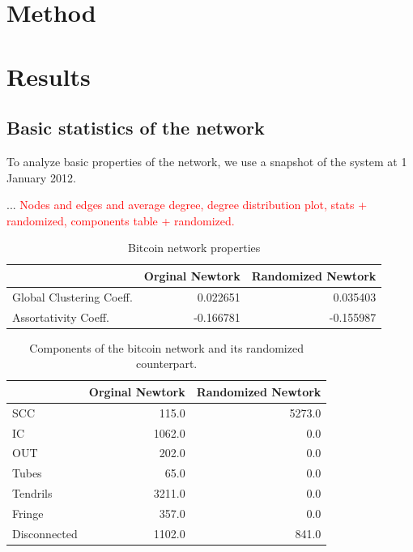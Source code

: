 \documentclass{Resources/netsci-project}
\begin{document}
\section{Method}

\lipsum

\section{Results}

\subsection{Basic statistics of the network}

To analyze basic properties of the network, we use a snapshot of the system at 1 January 2012. \newline

... \textcolor{red}{Nodes and edges and average degree, degree distribution plot, stats + randomized, components table + randomized.}

\lipsum[2]

\begin{table}
\centering
\begin{tabular}{lrr}
\toprule
{} &     Orginal Newtork &  Randomized Newtork \\
\midrule
Global Clustering Coeff.    &  0.022651 &      0.035403 \\
Assortativity Coeff. & -0.166781 &     -0.155987 \\
\bottomrule
\end{tabular}
\caption{Bitcoin network properties} 
\end{table}

\lipsum[1]


\lipsum[1]

\begin{table}
\centering
\begin{tabular}{lrr}
\toprule
{} &  Orginal Newtork &  Randomized Newtork \\
\midrule
SCC          &   115.0 &         5273.0 \\
IC           &  1062.0 &            0.0 \\
OUT          &   202.0 &            0.0 \\
Tubes        &    65.0 &            0.0 \\
Tendrils     &  3211.0 &            0.0 \\
Fringe       &   357.0 &            0.0 \\
Disconnected &  1102.0 &          841.0 \\
\bottomrule
\end{tabular}
\caption{Components of the bitcoin network and its randomized counterpart.} 
\end{table}
\end{document}
